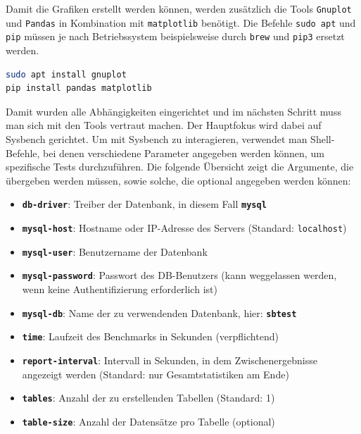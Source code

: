 Damit die Grafiken erstellt werden können, werden zusätzlich die Tools \texttt{Gnuplot} und \texttt{Pandas} in Kombination mit \texttt{matplotlib} benötigt.
Die Befehle \texttt{sudo apt} und \texttt{pip} müssen je nach Betriebssystem beispielsweise durch \texttt{brew} und \texttt{pip3} ersetzt werden.

\vspace{-4pt}
\begin{lstlisting}[language=bash]
sudo apt install gnuplot
pip install pandas matplotlib
\end{lstlisting}
\vspace{-9pt}

Damit wurden alle Abhängigkeiten eingerichtet und im nächsten Schritt muss man sich mit den Tools vertraut machen.
Der Hauptfokus wird dabei auf Sysbench gerichtet.
Um mit Sysbench zu interagieren, verwendet man Shell-Befehle, bei denen verschiedene Parameter angegeben werden können, um spezifische Tests durchzuführen.
Die folgende Übersicht zeigt die Argumente, die übergeben werden müssen, sowie solche, die optional angegeben werden können:

\vspace{-5pt}
\begin{itemize}
    \setlength{\itemsep}{-7pt}
    \item \textbf{\texttt{db-driver}}: Treiber der Datenbank, in diesem Fall \textbf{\texttt{mysql}}
    \item \textbf{\texttt{mysql-host}}: Hostname oder IP-Adresse des Servers (Standard: \texttt{localhost})
    \item \textbf{\texttt{mysql-user}}: Benutzername der Datenbank
    \item \textbf{\texttt{mysql-password}}: Passwort des DB-Benutzers (kann weggelassen werden, wenn keine Authentifizierung erforderlich ist)
    \item \textbf{\texttt{mysql-db}}: Name der zu verwendenden Datenbank, hier: \textbf{\texttt{sbtest}}
    \item \textbf{\texttt{time}}: Laufzeit des Benchmarks in Sekunden (verpflichtend)
    \item \textbf{\texttt{report-interval}}: Intervall in Sekunden, in dem Zwischenergebnisse angezeigt werden (Standard: nur Gesamtstatistiken am Ende)
    \item \textbf{\texttt{tables}}: Anzahl der zu erstellenden Tabellen (Standard: 1)
    \item \textbf{\texttt{table-size}}: Anzahl der Datensätze pro Tabelle (optional)
\end{itemize}

